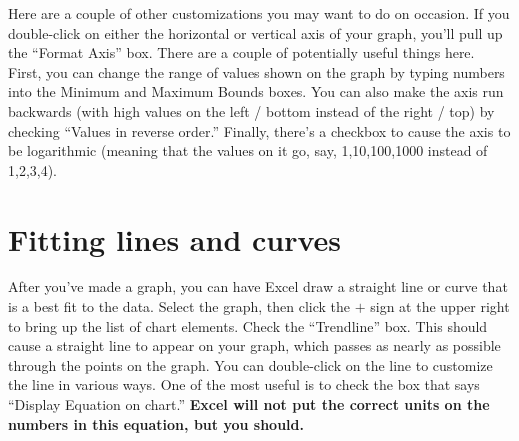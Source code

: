 Here are a couple of other customizations you may want to do on occasion.
If you double-click on either the horizontal or vertical axis
of your graph, you'll pull up the ``Format Axis'' box. There
are a couple of potentially useful things here. First, you can change
the range of values shown on the graph by
typing numbers into the Minimum and Maximum Bounds boxes.
You can also make the axis run backwards
(with high values on the left / bottom instead of the right / top) by
checking ``Values in reverse order.''
Finally, there's
a checkbox to cause the axis to be 
logarithmic (meaning that the values on it go, say, 1,10,100,1000
instead of 1,2,3,4). 


\section{Fitting lines and curves}


After you've made a graph, you can have Excel draw a straight line or
curve that is a best fit to the data.  Select the graph,
then click the $+$ sign at the upper right to bring up the
list of chart elements. Check the ``Trendline'' box.
This should cause a straight line to appear on your graph, which passes
as nearly as possible through the points on the graph.
You can double-click on the line to customize the line
in various ways. One of the most useful is to check the box that says
``Display Equation on chart.''
{\bf Excel will not put the correct units on the numbers in this equation,
but you should.}


